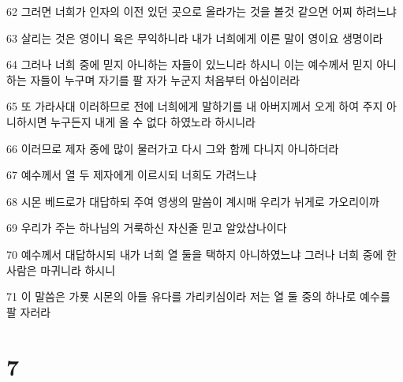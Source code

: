 \par 62 그러면 너희가 인자의 이전 있던 곳으로 올라가는 것을 볼것 같으면 어찌 하려느냐
\par 63 살리는 것은 영이니 육은 무익하니라 내가 너희에게 이른 말이 영이요 생명이라
\par 64 그러나 너희 중에 믿지 아니하는 자들이 있느니라 하시니 이는 예수께서 믿지 아니하는 자들이 누구며 자기를 팔 자가 누군지 처음부터 아심이러라
\par 65 또 가라사대 이러하므로 전에 너희에게 말하기를 내 아버지께서 오게 하여 주지 아니하시면 누구든지 내게 올 수 없다 하였노라 하시니라
\par 66 이러므로 제자 중에 많이 물러가고 다시 그와 함께 다니지 아니하더라
\par 67 예수께서 열 두 제자에게 이르시되 너희도 가려느냐
\par 68 시몬 베드로가 대답하되 주여 영생의 말씀이 계시매 우리가 뉘게로 가오리이까
\par 69 우리가 주는 하나님의 거룩하신 자신줄 믿고 알았삽나이다
\par 70 예수께서 대답하시되 내가 너희 열 둘을 택하지 아니하였느냐 그러나 너희 중에 한 사람은 마귀니라 하시니
\par 71 이 말씀은 가룟 시몬의 아들 유다를 가리키심이라 저는 열 둘 중의 하나로 예수를 팔 자러라

\chapter{7}

